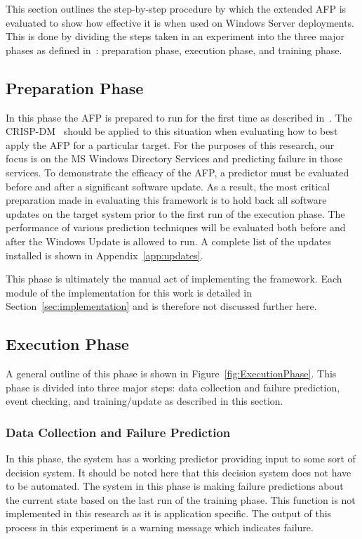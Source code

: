 This section outlines the step-by-step procedure by which the extended \ac{AFP}
is evaluated to show how effective it is when used on Windows Server
deployments.  This is done by dividing the steps taken in an experiment into
the three major phases as defined in~\cite{irrera2015}: preparation phase,
execution phase, and training phase.

\subsection{Preparation Phase}
In this phase the \ac{AFP} is prepared to run for the first time as described
in~\cite{irrera2015}.  The \ac{CRISP-DM}~\cite{crispdm} should be applied to
this situation when evaluating how to best apply the \ac{AFP} for a particular
target.  For the purposes of this research, our focus is on the \ac{MS}
Windows Directory Services and predicting failure in those services.  To
demonstrate the efficacy of the \ac{AFP}, a predictor must be evaluated before
and after a significant software update.  As a result, the most critical
preparation made in evaluating this framework is to hold back all software
updates on the target system prior to the first run of the execution phase.
The performance of various prediction techniques will be evaluated both before
and after the Windows Update is allowed to run.  A complete list of the updates
installed is shown in Appendix~\ref{app:updates}.

This phase is ultimately the manual act of implementing the framework.  Each
module of the implementation for this work is detailed in
Section~\ref{sec:implementation} and is therefore not discussed further here.  

\subsection{Execution Phase}
A general outline of this phase is shown in Figure~\ref{fig:ExecutionPhase}.
This phase is divided into three major steps: data collection and failure
prediction, event checking, and training/update as described in this section.

\figExecutionPhase{2.5in}

\subsubsection{Data Collection and Failure Prediction}
In this phase, the system has a working predictor providing input to some sort
of decision system.  It should be noted here that this decision system does not
have to be automated.  The system in this phase is making failure predictions
about the current state based on the last run of the training phase.  This
function is not implemented in this research as it is application specific.
The output of this process in this experiment is a warning message which
indicates failure.

